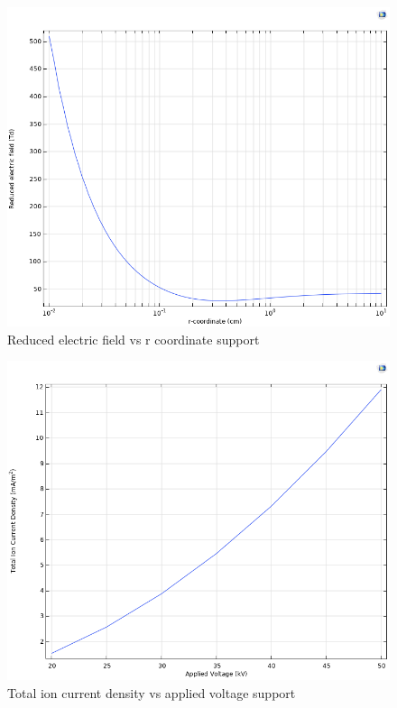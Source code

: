 \begin{figure}[p]
	\centering
	\includegraphics[scale=0.25]{images/results images/Comsol images/reduced electric field.png}
	\caption{Reduced electric field vs r coordinate
	support}
\end{figure}
\begin{figure}[p]
	\centering
	\includegraphics[scale=0.25]{images/results images/Comsol images/total ion current density.png}
	\caption{Total ion current density vs applied voltage
	support}
\end{figure}
